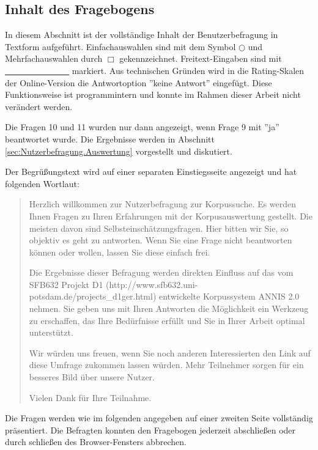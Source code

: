 

\newpage
\subsection{Inhalt des Fragebogens}\label{sec:Fragebogen.Inhalt}

In diesem Abschnitt ist der vollständige Inhalt der Benutzerbefragung in Textform aufgeführt. Einfachauswahlen sind mit dem Symbol $\bigcirc$ und Mehrfachauswahlen durch $\Box$ gekennzeichnet. Freitext-Eingaben sind mit \underline{\ \ \ \ \ \ \ \ \ \ \ \ \ \ \ } markiert. Aus technischen Gründen wird in die Rating-Skalen der Online-Version die Antwortoption ''keine Antwort'' eingefügt. Diese Funktionsweise ist programmintern und konnte im Rahmen dieser Arbeit nicht verändert werden.
	
Die Fragen 10 und 11 wurden  nur dann angezeigt, wenn Frage 9 mit ''ja'' beantwortet wurde. Die Ergebnisse werden in Abschnitt \ref{sec:Nutzerbefragung.Auswertung} vorgestellt und diskutiert.

Der Begrüßungstext wird auf einer separaten Einstiegsseite angezeigt und hat folgenden Wortlaut:
\begin{quote}
Herzlich willkommen zur Nutzerbefragung zur Korpussuche. Es werden Ihnen Fragen zu Ihren Erfahrungen mit der Korpusauswertung gestellt. Die meisten davon sind Selbsteinschätzungsfragen. Hier bitten wir Sie, so objektiv es geht zu antworten. Wenn Sie eine Frage nicht beantworten können oder wollen, lassen Sie diese einfach frei. 

Die Ergebnisse dieser Befragung werden direkten Einfluss auf das vom SFB632 Projekt D1 (http://www.sfb632.uni-potsdam.de/projects\_d1ger.html) entwickelte Korpussystem ANNIS 2.0 nehmen. Sie geben uns mit Ihren Antworten die Möglichkeit ein Werkzeug zu erschaffen, das Ihre Bedürfnisse erfüllt und Sie in Ihrer Arbeit optimal unterstützt. 

Wir würden uns freuen, wenn Sie noch anderen Interessierten den Link auf diese Umfrage zukommen lassen würden. Mehr Teilnehmer sorgen für ein besseres Bild über unsere Nutzer. 

Vielen Dank für Ihre Teilnahme.
\end{quote}

Die Fragen werden wie im folgenden angegeben auf einer zweiten Seite vollständig präsentiert. Die Befragten konnten den Fragebogen jederzeit abschließen oder durch schließen des Browser-Fensters abbrechen.

	

